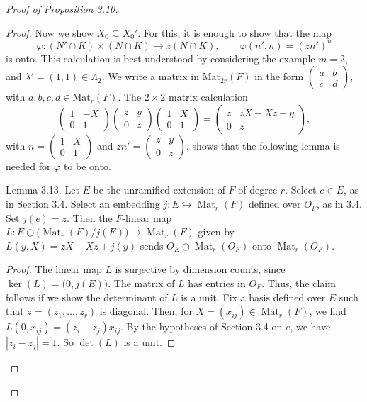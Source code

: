 \documentclass{amsart}
\begin{document}
\begin{proof}[Proof of Proposition 3.10]
\begin{proof}
Now we show $X_0\subseteq X_0'$.  For this, it is enough to show
that the map $$\varphi:(N'\cap K)\times (N\cap K)\to z(N\cap K),\qquad
      \varphi(n',n) = (zn')^n$$
is onto.  This calculation is best understood by considering the
example $m=2$, and $\lambda'=(1,1)\in \Lambda_2$.
We write a matrix in $\text{Mat}_{2r}(F)$ in the form
$\begin{pmatrix}  a&b\\c&d\end{pmatrix}$, with $a,b,c,d\in\text{Mat}_r(F)$.
The $2\times2$ matrix calculation
%
$$\begin{pmatrix}  1&-X\\0&1\end{pmatrix}
  \begin{pmatrix}  z&y\\0&z\end{pmatrix}
  \begin{pmatrix}  1&X\\0&1\end{pmatrix} =
  \begin{pmatrix}  z& zX-Xz+y\\0&z\end{pmatrix},$$
  with 
  $n=\begin{pmatrix} 1&X\\0&1\end{pmatrix}$ and 
  $zn'=\begin{pmatrix}  z&y\\0&z\end{pmatrix}$,
%
shows that the following lemma is needed for $\varphi$ to be onto.

\proclaim Lemma {3.13}.
Let $E$ be the unramified extension of $F$ of degree $r$.
Select $e\in E$, as in Section 3.4.  Select an embedding
  $ j : E \hookrightarrow \operatorname{Mat}_r (F) $ defined
  over $O_F$,
as in\/ {\rm 3.4}.
Set $ j(e) = z$.
Then the $F$-linear map
  $ L :
    E \oplus 
    \bigl(
      \operatorname{Mat}_r (F) \big/ j (E)
    \bigr)
    \to
    \operatorname{Mat}_r (F) $
given by 
  $L (y,X) =z X - X z + j (y) $
sends
  $ O_E \oplus \operatorname{Mat}_r (O_F) $
{\rm onto}
  $ \operatorname{Mat}_r (O_F) $.
\finishproclaim

\begin{proof}
The linear map
  $L$ is surjective by dimension counts, since
  $ \ker (L) = 
    \bigl(
       0, j (E)
    \bigr) $.
The matrix of $L$ has entries in
  $ O_F $.
Thus, the claim follows if we show the determinant of $L$ is a unit.
Fix a basis defined over $E$ such that 
  $ z = (z_1,\ldots,z_r) $ 
is diagonal.
Then, for
  $ X= (x_{ij}) \in \operatorname{Mat}_r (F) $,
  we find $ L(0,x_{ij}) = (z_i - z_j) x_{ij} $.
By the hypotheses of Section 3.4 on $e$, we have
  $ |z_i - z_j| = 1 $.
So 
  $ \det (L) $
is a unit.
\end{proof}


\end{proof}
\end{proof}
\end{document}
